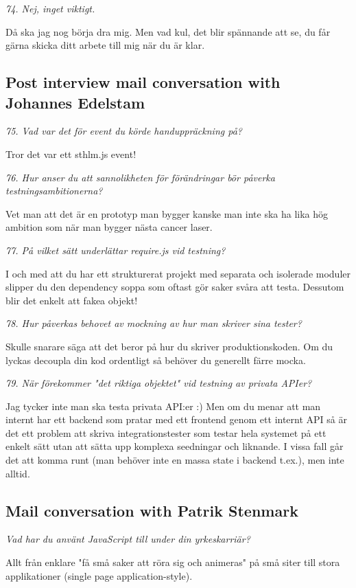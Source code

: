 \documentclass[11pt]{article}
\begin{document}
\emph{74. Nej, inget viktigt.}

Då ska jag nog börja dra mig. Men vad kul, det blir spännande att se, du får gärna skicka ditt arbete till mig när du är klar.


\subsection*{Post interview mail conversation with Johannes Edelstam}

\emph{75. Vad var det för event du körde handuppräckning på?}

Tror det var ett sthlm.js event!

\emph{76. Hur anser du att sannolikheten för förändringar bör påverka testningsambitionerna?}

Vet man att det är en prototyp man bygger kanske man inte ska ha lika hög ambition som när man bygger nästa cancer laser.

\emph{77. På vilket sätt underlättar require.js vid testning?}

I och med att du har ett strukturerat projekt med separata och isolerade moduler slipper du den dependency soppa som oftast gör saker svåra att testa. Dessutom blir det enkelt att fakea objekt!

\emph{78. Hur påverkas behovet av mockning av hur man skriver sina tester?}

Skulle snarare säga att det beror på hur du skriver produktionskoden. Om du lyckas decoupla din kod ordentligt så behöver du generellt färre mocka.

\emph{79. När förekommer "det riktiga objektet" vid testning av privata APIer?}

Jag tycker inte man ska testa privata API:er :) Men om du menar att man internt har ett backend som pratar med ett frontend genom ett internt API så är det ett problem att skriva integrationstester som testar hela systemet på ett enkelt sätt utan att sätta upp komplexa seedningar och liknande. I vissa fall går det att komma runt (man behöver inte en massa state i backend t.ex.), men inte alltid.


\subsection*{Mail conversation with Patrik Stenmark}

\emph{Vad har du använt JavaScript till under din yrkeskarriär?}

Allt från enklare "få små saker att röra sig och animeras" på små siter
till stora applikationer (single page application-style).
\end{document}
